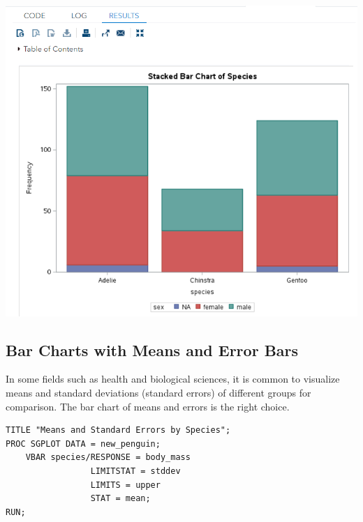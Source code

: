 \documentclass[
]{book}
\begin{document}
\begin{center}\includegraphics[width=1\linewidth]{img06/w06-stackedBarChart} \end{center}

\hypertarget{bar-charts-with-means-and-error-bars}{%
\subsection{Bar Charts with Means and Error Bars}\label{bar-charts-with-means-and-error-bars}}

In some fields such as health and biological sciences, it is common to visualize means and standard deviations (standard errors) of different groups for comparison. The bar chart of means and errors is the right choice.

\begin{verbatim}
TITLE "Means and Standard Errors by Species";
PROC SGPLOT DATA = new_penguin;
    VBAR species/RESPONSE = body_mass
                 LIMITSTAT = stddev
                 LIMITS = upper 
                 STAT = mean; 
RUN;
\end{verbatim}
\end{document}
